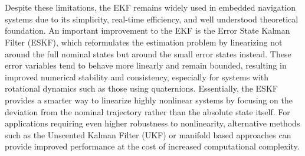 \\ \\
Despite these limitations, the EKF remains widely used in embedded navigation systems due to its simplicity, real-time efficiency, and well understood theoretical foundation. An important improvement to the EKF is the Error State Kalman Filter (ESKF), which reformulates the estimation problem by linearizing not around the full nominal states but around the small error states instead. These error variables tend to behave more linearly and remain bounded, resulting in improved numerical stability and consistency, especially for systems with rotational dynamics such as those using quaternions. Essentially, the ESKF provides a smarter way to linearize highly nonlinear systems by focusing on the deviation from the nominal trajectory rather than the absolute state itself. For applications requiring even higher robustness to nonlinearity, alternative methods such as the Unscented Kalman Filter (UKF) or manifold based approaches can provide improved performance at the cost of increased computational complexity.

